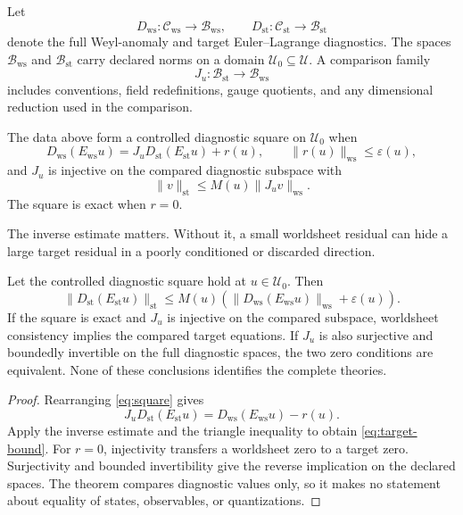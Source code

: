 \documentclass[11pt]{article}
\newcommand{\cB}{\mathcal{B}}
\newcommand{\cC}{\mathcal{C}}
\newcommand{\cU}{\mathcal{U}}
\begin{document}
Let
\[
D_{\mathrm{ws}}:\cC_{\mathrm{ws}}\to\cB_{\mathrm{ws}},
\qquad
D_{\mathrm{st}}:\cC_{\mathrm{st}}\to\cB_{\mathrm{st}}
\]
denote the full Weyl-anomaly and target Euler--Lagrange diagnostics.
The spaces \(\cB_{\mathrm{ws}}\) and \(\cB_{\mathrm{st}}\) carry declared
norms on a domain \(\cU_0\subseteq\cU\).  A comparison family
\[
J_u:\cB_{\mathrm{st}}\to\cB_{\mathrm{ws}}
\]
includes conventions, field redefinitions, gauge quotients, and any
dimensional reduction used in the comparison.

\begin{definition}
The data above form a controlled diagnostic square on \(\cU_0\) when
\begin{equation}
D_{\mathrm{ws}}(E_{\mathrm{ws}}u)
=J_uD_{\mathrm{st}}(E_{\mathrm{st}}u)+r(u),
\qquad
\|r(u)\|_{\mathrm{ws}}\leq\varepsilon(u),
\label{eq:square}
\end{equation}
and \(J_u\) is injective on the compared diagnostic subspace with
\[
\|v\|_{\mathrm{st}}\leq M(u)\|J_uv\|_{\mathrm{ws}}.
\]
The square is exact when \(r=0\).
\end{definition}

The inverse estimate matters.  Without it, a small worldsheet residual can
hide a large target residual in a poorly conditioned or discarded direction.

\begin{theorem}
\label{thm:square}
Let the controlled diagnostic square hold at \(u\in\cU_0\).  Then
\begin{equation}
\|D_{\mathrm{st}}(E_{\mathrm{st}}u)\|_{\mathrm{st}}
\leq M(u)\left(
\|D_{\mathrm{ws}}(E_{\mathrm{ws}}u)\|_{\mathrm{ws}}
+\varepsilon(u)\right).
\label{eq:target-bound}
\end{equation}
If the square is exact and \(J_u\) is injective on the compared subspace,
worldsheet consistency implies the compared target equations.  If \(J_u\)
is also surjective and boundedly invertible on the full diagnostic spaces,
the two zero conditions are equivalent.  None of these conclusions identifies
the complete theories.
\end{theorem}

\begin{proof}
Rearranging \eqref{eq:square} gives
\[
J_uD_{\mathrm{st}}(E_{\mathrm{st}}u)
=D_{\mathrm{ws}}(E_{\mathrm{ws}}u)-r(u).
\]
Apply the inverse estimate and the triangle inequality to obtain
\eqref{eq:target-bound}.  For \(r=0\), injectivity transfers a worldsheet
zero to a target zero.  Surjectivity and bounded invertibility give the
reverse implication on the declared spaces.  The theorem compares diagnostic
values only, so it makes no statement about equality of states, observables,
or quantizations.
\end{proof}
\end{document}
